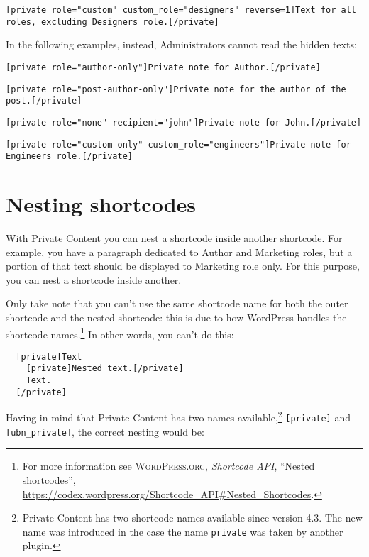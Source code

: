 \begin{lstlisting}
[private role="custom" custom_role="designers" reverse=1]Text for all roles, excluding Designers role.[/private]
\end{lstlisting}

In the following examples, instead, Administrators cannot read the hidden texts:

\begin{lstlisting}
[private role="author-only"]Private note for Author.[/private]
\end{lstlisting}

\begin{lstlisting}
[private role="post-author-only"]Private note for the author of the post.[/private]
\end{lstlisting}

\begin{lstlisting}
[private role="none" recipient="john"]Private note for John.[/private]
\end{lstlisting}

\begin{lstlisting}
[private role="custom-only" custom_role="engineers"]Private note for Engineers role.[/private]
\end{lstlisting}

\chapter{Nesting shortcodes}

With Private Content you can nest a shortcode inside another shortcode. For
example, you have a paragraph dedicated to Author and Marketing roles, but a
portion of that text should be displayed to Marketing role only. For this
purpose, you can nest a shortcode inside another.

Only take note that you can't use the same shortcode name for both the outer
shortcode and the nested shortcode: this is due to how WordPress handles the
shortcode names.\footnote{For more information see \textsc{WordPress.org},
\textit{Shortcode API}, ``Nested shortcodes'',
\url{https://codex.wordpress.org/Shortcode_API\#Nested_Shortcodes}.}
In other words, you can't do this:

\begin{lstlisting}
  [private]Text
    [private]Nested text.[/private]
    Text.
  [/private]
\end{lstlisting}

Having in mind that Private Content has two names available,\footnote{Private
Content has two shortcode names available since version 4.3. The new name was
introduced in the case the name \texttt{private} was taken by another plugin.}
\texttt{[private]} and \texttt{[ubn\_private]}, the correct nesting would be:

